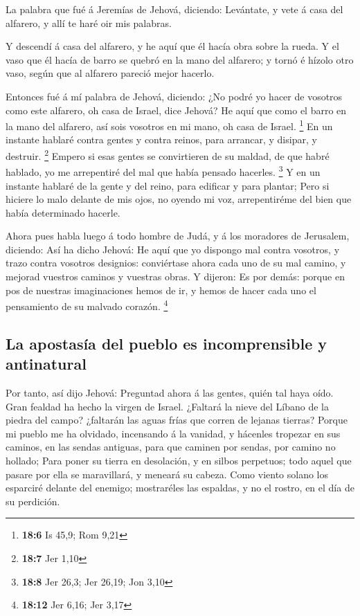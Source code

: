  La palabra que fué á Jeremías de Jehová, diciendo:
 Levántate, y vete á casa del alfarero, y allí te haré oir
mis palabras.

 Y descendí á casa del alfarero, y he aquí que él hacía obra
sobre la rueda.  Y el vaso que él hacía de barro se quebró
en la mano del alfarero; y tornó é hízolo otro vaso, según que al
alfarero pareció mejor hacerlo.

 Entonces fué á mí palabra de Jehová, diciendo: 
¿No podré yo hacer de vosotros como este alfarero, oh casa de Israel,
dice Jehová? He aquí que como el barro en la mano del alfarero, así sois
vosotros en mi mano, oh casa de Israel. \footnote{\textbf{18:6} Is 45,9;
  Rom 9,21}  En un instante hablaré contra gentes y contra
reinos, para arrancar, y disipar, y destruir. \footnote{\textbf{18:7}
  Jer 1,10}  Empero si esas gentes se convirtieren de su
maldad, de que habré hablado, yo me arrepentiré del mal que había
pensado hacerles. \footnote{\textbf{18:8} Jer 26,3; Jer 26,19; Jon 3,10}
 Y en un instante hablaré de la gente y del reino, para
edificar y para plantar;  Pero si hiciere lo malo delante
de mis ojos, no oyendo mi voz, arrepentiréme del bien que había
determinado hacerle.

 Ahora pues habla luego á todo hombre de Judá, y á los
moradores de Jerusalem, diciendo: Así ha dicho Jehová: He aquí que yo
dispongo mal contra vosotros, y trazo contra vosotros designios:
conviértase ahora cada uno de su mal camino, y mejorad vuestros caminos
y vuestras obras.  Y dijeron: Es por demás: porque en pos
de nuestras imaginaciones hemos de ir, y hemos de hacer cada uno el
pensamiento de su malvado corazón. \footnote{\textbf{18:12} Jer 6,16;
  Jer 3,17}

\hypertarget{la-apostasuxeda-del-pueblo-es-incomprensible-y-antinatural}{%
\subsection{La apostasía del pueblo es incomprensible y
antinatural}\label{la-apostasuxeda-del-pueblo-es-incomprensible-y-antinatural}}

 Por tanto, así dijo Jehová: Preguntad ahora á las gentes,
quién tal haya oído. Gran fealdad ha hecho la virgen de Israel.
 ¿Faltará la nieve del Líbano de la piedra del campo?
¿faltarán las aguas frías que corren de lejanas tierras? 
Porque mi pueblo me ha olvidado, incensando á la vanidad, y hácenles
tropezar en sus caminos, en las sendas antiguas, para que caminen por
sendas, por camino no hollado;  Para poner su tierra en
desolación, y en silbos perpetuos; todo aquel que pasare por ella se
maravillará, y meneará su cabeza.  Como viento solano los
esparciré delante del enemigo; mostraréles las espaldas, y no el rostro,
en el día de su perdición.

